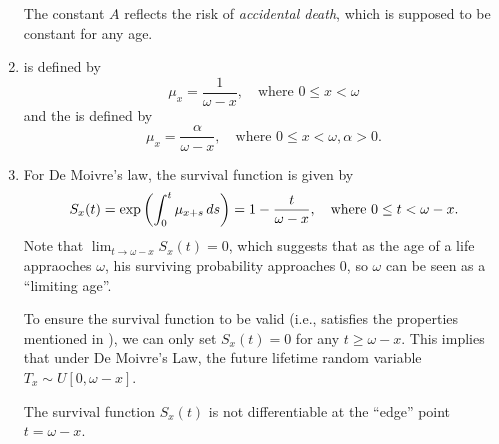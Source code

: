 \begin{enumerate}
The constant \(A\) reflects the risk of \emph{accidental death}, which is
supposed to be constant for any age.

\item {} is defined by
\[
\mu_x=\frac{1}{\omega-x}, \quad\text{where }0\le x<\omega
\]
and the  is defined by
\[
\mu_x=\frac{\alpha}{\omega-x}, \quad\text{where }0\le x<\omega, \alpha>0.
\]


\item \label{it:de-moivre-dist-surv}
For De Moivre's law, the survival function is given by
\[
S_x(t)=\exp\qty(\int_{0}^{t}\mu_{x+s}\,ds)
=1-\frac{t}{\omega-x},\quad\text{where }0 \le t<\omega-x.
\]
Note that \(\lim_{t\to \omega-x}S_x(t)=0\), which suggests that as the age of a
life appraoches \(\omega\), his surviving probability approaches 0, so
\(\omega\) can be seen as a ``limiting age''.

To ensure the survival function to be valid (i.e., satisfies the properties
mentioned in ), we can only set \(S_x(t)=0\) for any
\(t\ge \omega-x\). This implies that under De Moivre's Law, the future lifetime
random variable \(T_x\sim U[0,\omega-x]\).

\begin{note}
The survival function \(S_x(t)\) is not differentiable at the
``edge'' point \(t=\omega-x\).

\end{note}


\end{enumerate}

